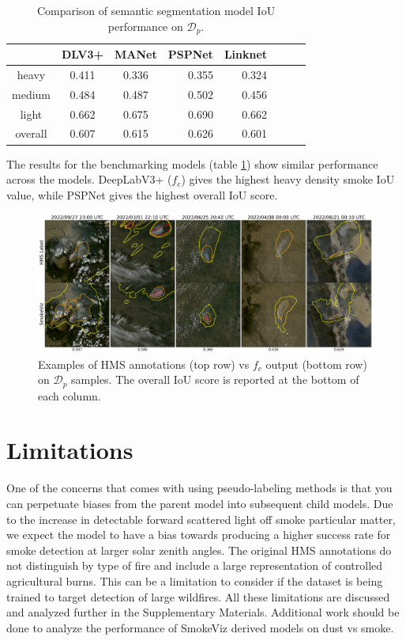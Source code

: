 \documentclass{article}
\begin{document}
\begin{table}[h]
    \caption{Comparison of semantic segmentation model IoU performance on \(\mathcal{D}_{p}\).}\label{bench}
    \centering
    \begin{tabular}{cccrrcrc}
        \toprule
           & DLV3+ & MANet & PSPNet & Linknet \\
        \midrule
        heavy   & 0.411 & 0.336  & 0.355 & 0.324 \\
        medium  & 0.484 & 0.487  & 0.502 & 0.456 \\
        light   & 0.662 & 0.675  & 0.690 & 0.662 \\
        overall & 0.607 & 0.615  & 0.626 & 0.601 \\
        \bottomrule
    \end{tabular}
\end{table}

The results for the benchmarking models (table \ref{bench}) show similar performance across the models. DeepLabV3+ (\(f_c\)) gives the highest heavy density smoke IoU value, while PSPNet gives the highest overall IoU score.

\begin{figure}[!htb]
    \centering
    \includegraphics[width=\linewidth]{figures/examples.png}
    \caption{Examples of HMS annotations (top row) vs \(f_{c}\) output (bottom row) on \(\mathcal{D}_{p}\) samples. The overall IoU score is reported at the bottom of each column.}\label{examples}
\end{figure}

\section{Limitations}

One of the concerns that comes with using pseudo-labeling methods is that you can perpetuate biases from the parent model into subsequent child models. Due to the increase in detectable forward scattered light off smoke particular matter, we expect the model to have a bias towards producing a higher success rate for smoke detection at larger solar zenith angles. The original HMS annotations do not distinguish by type of fire and include a large representation of controlled agricultural burns. This can be a limitation to consider if the dataset is being trained to target detection of large wildfires. All these limitations are discussed and analyzed further in the Supplementary Materials. Additional work should be done to analyze the performance of SmokeViz derived models on dust vs smoke.
\end{document}
